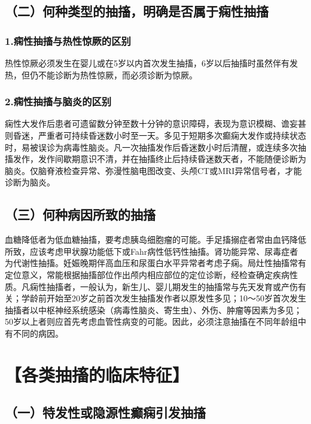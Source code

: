 \subsection{（二）何种类型的抽搐，明确是否属于痫性抽搐}

\subsubsection{1.痫性抽搐与热性惊厥的区别}

热性惊厥必须发生在婴儿或在5岁以内首次发生抽搐，6岁以后抽搐时虽然伴有发热，但仍不能诊断为热性惊厥，而必须诊断为惊厥。

\subsubsection{2.痫性抽搐与脑炎的区别}

痫性大发作后患者可遗留数分钟至数十分钟的意识障碍，表现为意识模糊、谵妄甚则昏迷，严重者可持续昏迷数小时至一天。多见于短期多次癫痫大发作或持续状态时，易被误诊为病毒性脑炎。凡一次抽搐发作后昏迷数小时后清醒，或连续多次抽搐发作，发作间歇期意识不清，并在抽搐终止后持续昏迷数天者，不能随便诊断为脑炎。仅脑脊液检查异常、弥漫性脑电图改变、头颅CT或MRI异常信号者，才能诊断为脑炎。

\subsection{（三）何种病因所致的抽搐}

血糖降低者为低血糖抽搐，要考虑胰岛细胞瘤的可能。手足搐搦症者常由血钙降低所致，应该考虑甲状腺功能低下或Fahr病性低钙性抽搐。肾功能异常、尿毒症者为代谢性抽搐。妊娠晚期伴高血压和尿蛋白水平异常者考虑子痫。局灶性抽搐常有定位意义，常能根据抽搐部位作出颅内相应部位的定位诊断，经检查确定疾病性质。凡痫性抽搐者，一般认为，新生儿、婴儿期发生的抽搐常与先天发育或产伤有关；学龄前开始至20岁之前首次发生抽搐发作者以原发性多见；10～50岁首次发生抽搐者以中枢神经系统感染（病毒性脑炎、寄生虫）、外伤、肿瘤等因素为多见；50岁以上者则应首先考虑血管性病变的可能。因此，必须注意抽搐在不同年龄组中有不同的病因。

\section{【各类抽搐的临床特征】}

\subsection{（一）特发性或隐源性癫痫引发抽搐}

